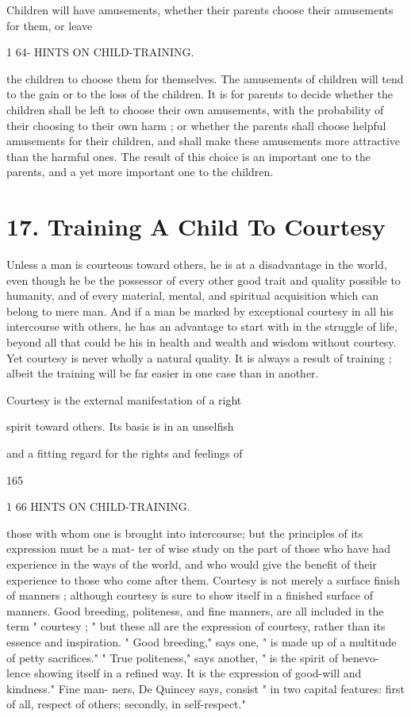 \documentclass[
]{book}
\begin{document}
Children will have amusements, whether their parents choose their amusements for them, or leave

1 64- HINTS ON CHILD-TRAINING.

the children to choose them for themselves. The amusements of children will tend to the gain or to the loss of the children. It is for parents to decide whether the children shall be left to choose their own amusements, with the probability of their choosing to their own harm ; or whether the parents shall choose helpful amusements for their children, and shall make these amusements more attractive than the harmful ones. The result of this choice is an important one to the parents, and a yet more important one to the children.

\hypertarget{training-a-child-to-courtesy}{%
\chapter{17. Training A Child To Courtesy}\label{training-a-child-to-courtesy}}

Unless a man is courteous toward others, he is at a disadvantage in the world, even though he be the possessor of every other good trait and quality possible to humanity, and of every material, mental, and spiritual acquisition which can belong to mere man. And if a man be marked by exceptional courtesy in all his intercourse with others, he has an advantage to start with in the struggle of life, beyond all that could be his in health and wealth and wisdom without courtesy. Yet courtesy is never wholly a natural quality. It is always a result of training ; albeit the training will be far easier in one case than in another.

Courtesy is the external manifestation of a right

spirit toward others. Its basis is in an unselfish

and a fitting regard for the rights and feelings of

165

1 66 HINTS ON CHILD-TRAINING.

those with whom one is brought into intercourse; but the principles of its expression must be a mat- ter of wise study on the part of those who have had experience in the ways of the world, and who would give the benefit of their experience to those who come after them. Courtesy is not merely a surface finish of manners ; although courtesy is sure to show itself in a finished surface of manners. Good breeding, politeness, and fine manners, are all included in the term " courtesy ; " but these all are the expression of courtesy, rather than its essence and inspiration. " Good breeding," says one, " is made up of a multitude of petty sacrifices." " True politeness," says another, " is the spirit of benevo- lence showing itself in a refined way. It is the expression of good-will and kindness." Fine man- ners, De Quincey says, consist " in two capital features: first of all, respect of others; secondly, in self-respect."
\end{document}
